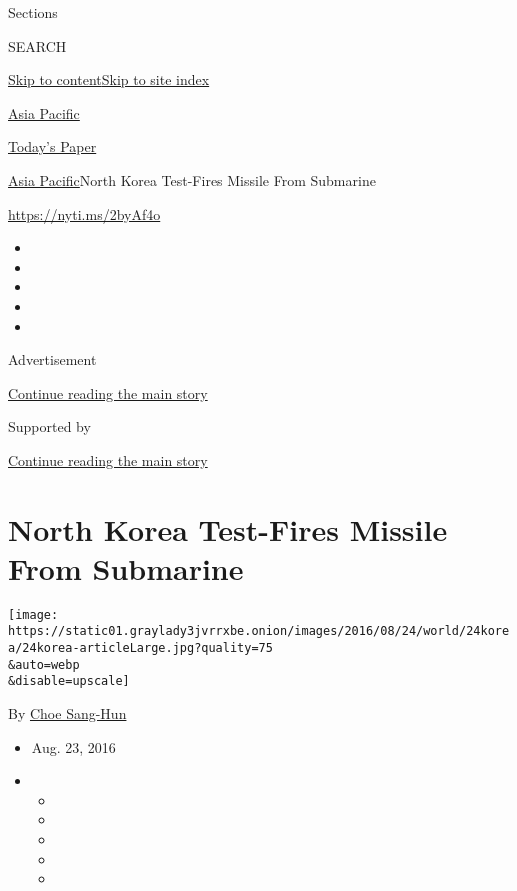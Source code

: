Sections

SEARCH

\protect\hyperlink{site-content}{Skip to
content}\protect\hyperlink{site-index}{Skip to site index}

\href{https://www.nytimes3xbfgragh.onion/section/world/asia}{Asia
Pacific}

\href{https://myaccount.nytimes3xbfgragh.onion/auth/login?response_type=cookie\&client_id=vi}{}

\href{https://www.nytimes3xbfgragh.onion/section/todayspaper}{Today's
Paper}

\href{/section/world/asia}{Asia Pacific}\textbar{}North Korea Test-Fires
Missile From Submarine

\url{https://nyti.ms/2byAf4o}

\begin{itemize}
\item
\item
\item
\item
\item
\end{itemize}

Advertisement

\protect\hyperlink{after-top}{Continue reading the main story}

Supported by

\protect\hyperlink{after-sponsor}{Continue reading the main story}

\hypertarget{north-korea-test-fires-missile-from-submarine}{%
\section{North Korea Test-Fires Missile From
Submarine}\label{north-korea-test-fires-missile-from-submarine}}

\texttt{[image: https://static01.graylady3jvrrxbe.onion/images/2016/08/24/world/24korea/24korea-articleLarge.jpg?quality=75\\\&auto=webp\\\&disable=upscale]}

By \href{http://www.nytimes3xbfgragh.onion/by/choe-sang-hun}{Choe
Sang-Hun}

\begin{itemize}
\item
  Aug. 23, 2016
\item
  \begin{itemize}
  \item
  \item
  \item
  \item
  \item
  \end{itemize}
\end{itemize}


